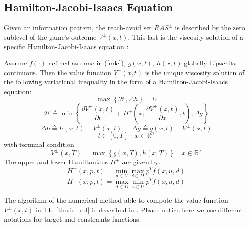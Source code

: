 \subsection{Hamilton-Jacobi-Isaacs Equation}
Given an information pattern, the reach-avoid set $RAS^\pm$ is described by the zero sublevel of the game's outcome $V^\pm(x,t)$. This last is the viscosity solution of a specific Hamilton-Jacobi-Isaacs equation \cite{new_paper}:
\begin{theorem}
    Assume $f(\cdot)$ defined as done in (\ref{ode}), $g(x,t)$, $h(x,t)$ globally Lipschitz continuous. Then the value function $V^\pm(x,t)$ is the unique viscosity solution of the following variational inequality in the form of a Hamilton-Jacobi-Isaacs equation:
    \[
        \max
        \left\{
            \mathcal{H}, \Delta h
        \right\} = 0
    \]
    \[
        \mathcal{H} \triangleq \min
        \left\{
            \frac{\partial V^\pm(x,t)}{\partial t} + 
            H^\pm\left(x, \frac{\partial V^\pm(x,t)}{\partial x}, t\right), \Delta g
        \right\} 
    \]
    \[
        \Delta h \triangleq h(x,t) - V^\pm(x,t), \quad \Delta g \triangleq g(x,t) - V^\pm(x,t)
    \]
    \[
        t \in [0, T] \quad x \in \mathbb{R}^n
    \]
    with terminal condition
    \[
        V^\pm(x,T) = \max \left\{ g(x,T), h(x,T) \right\} \quad x \in \mathbb{R}^n
    \]
    The upper and lower Hamiltonians $H^\pm$ are given by:
    \[
        H^+(x,p,t) = \min_{u \in U}\max_{d \in D} p^T f(x, u, d)
    \]    
    \[
        H^-(x,p,t) = \max_{d \in D}\min_{u \in U} p^T f(x, u, d)
    \]
    \label{th:vis_sol}
\end{theorem}

The algorithm of the numerical method able to compute the value function $V^\pm(x,t)$ in Th. \ref{th:vis_sol} is described in \cite{new_paper}. Please notice here we use different notations for target and constraints functions.